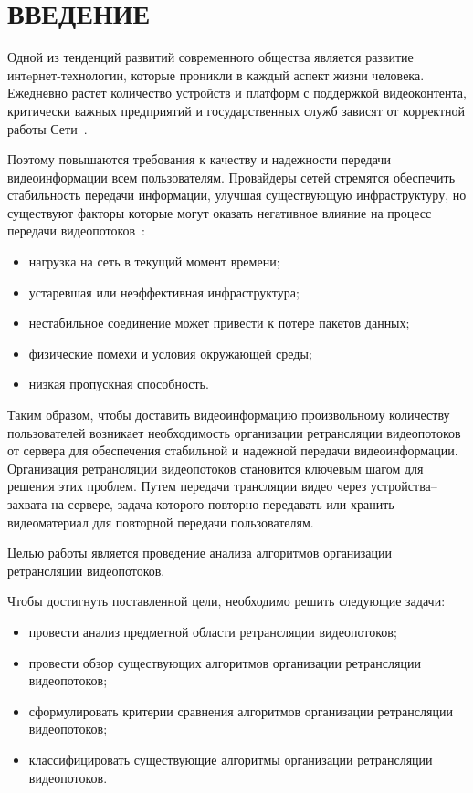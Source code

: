 \chapter*{ВВЕДЕНИЕ}

Одной из тенденций развитий современного общества является развитие интeрнет-технологии, которые проникли в каждый аспект жизни человека.
Ежедневно растет количество устройств и платформ с поддержкой видеоконтента, критически важных предприятий и государственных служб зависят от корректной работы Сети~\cite{mediascope_2022}.

Поэтому повышаются требования к качеству и надежности передачи видеоинформации всем пользователям.
Провайдеры сетей стремятся обеспечить стабильность  передачи информации, улучшая существующую инфраструктуру, но существуют факторы которые могут оказать негативное влияние на процесс передачи видеопотоков~\cite{research_videocontent_2021, research_videocontent_2023}:
\begin{itemize}
	\item нагрузка на сеть в текущий момент времени;
	\item устаревшая или неэффективная инфраструктура;
	\item нестабильное соединение может привести к потере пакетов данных;
	\item физические помехи и условия окружающей среды;
	\item низкая пропускная способность.
\end{itemize}

Таким образом, чтобы доставить видеоинформацию произвольному количеству пользователей возникает необходимость организации ретрансляции видеопотоков от сервера для обеспечения стабильной и надежной передачи видеоинформации. 
Организация ретрансляции видеопотоков становится ключевым шагом для решения этих проблем. Путем передачи трансляции видео через устройства--захвата на сервере, задача которого повторно передавать или хранить видеоматериал для повторной передачи пользователям.

Целью работы является проведение анализа алгоритмов организации ретрансляции видеопотоков.

\clearpage

Чтобы достигнуть поставленной цели, необходимо решить следующие задачи:
\begin{itemize}
	\item провести анализ предметной области ретрансляции видеопотоков;
	\item провести обзор существующих алгоритмов организации ретрансляции видеопотоков;
	\item сформулировать критерии сравнения алгоритмов организации ретрансляции видеопотоков;
	\item классифицировать существующие алгоритмы организации ретрансляции видеопотоков.  
\end{itemize}
